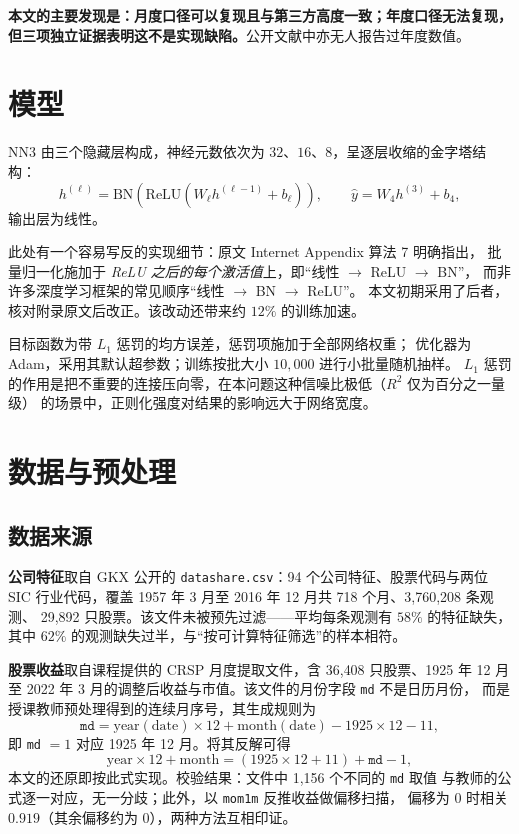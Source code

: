 \documentclass[11pt,a4paper,fontset=windows]{ctexart}
\newcommand{\code}[1]{\texttt{#1}}
\begin{document}
\textbf{本文的主要发现是：月度口径可以复现且与第三方高度一致；年度口径无法复现，
但三项独立证据表明这不是实现缺陷。}公开文献中亦无人报告过年度数值。

\section{模型}\label{sec:model}

NN3 由三个隐藏层构成，神经元数依次为 $32$、$16$、$8$，呈逐层收缩的金字塔结构：
\begin{equation}
h^{(\ell)} = \mathrm{BN}\!\left(\mathrm{ReLU}(W_\ell h^{(\ell-1)} + b_\ell)\right),\qquad
\hat y = W_4 h^{(3)} + b_4 ,
\end{equation}
输出层为线性。

此处有一个容易写反的实现细节：原文 Internet Appendix 算法 7 明确指出，
批量归一化施加于 \emph{ReLU 之后的每个激活值}上，即``线性 $\to$ ReLU $\to$ BN''，
而非许多深度学习框架的常见顺序``线性 $\to$ BN $\to$ ReLU''。
本文初期采用了后者，核对附录原文后改正。该改动还带来约 $12\%$ 的训练加速。

目标函数为带 $L_1$ 惩罚的均方误差，惩罚项施加于全部网络权重；
优化器为 Adam，采用其默认超参数；训练按批大小 $10{,}000$ 进行小批量随机抽样。
$L_1$ 惩罚的作用是把不重要的连接压向零，在本问题这种信噪比极低（$R^2$ 仅为百分之一量级）
的场景中，正则化强度对结果的影响远大于网络宽度。

\section{数据与预处理}\label{sec:data}

\subsection{数据来源}

\textbf{公司特征}取自 GKX 公开的 \code{datashare.csv}：94 个公司特征、股票代码与两位 SIC
行业代码，覆盖 1957 年 3 月至 2016 年 12 月共 718 个月、3{,}760{,}208 条观测、
29{,}892 只股票。该文件未被预先过滤——平均每条观测有 $58\%$ 的特征缺失，
其中 $62\%$ 的观测缺失过半，与``按可计算特征筛选''的样本相符。

\textbf{股票收益}取自课程提供的 CRSP 月度提取文件，含 36{,}408 只股票、1925 年 12 月至
2022 年 3 月的调整后收益与市值。该文件的月份字段 \code{md} 不是日历月份，
而是授课教师预处理得到的连续月序号，其生成规则为
\begin{equation}
\code{md} = \mathrm{year}(\text{date})\times 12 + \mathrm{month}(\text{date}) - 1925\times 12 - 11,
\end{equation}
即 \code{md} $=1$ 对应 1925 年 12 月。将其反解可得
\begin{equation}
\mathrm{year}\times 12 + \mathrm{month} = (1925\times 12 + 11) + \code{md} - 1 ,
\end{equation}
本文的还原即按此式实现。校验结果：文件中 1{,}156 个不同的 \code{md} 取值
与教师的公式逐一对应，无一分歧；此外，以 \code{mom1m} 反推收益做偏移扫描，
偏移为 0 时相关 $0.919$（其余偏移约为 0），两种方法互相印证。
\end{document}
